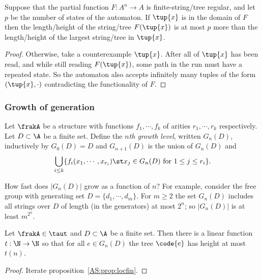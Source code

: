 
\begin{proposition} \label{AS:prop:locfin} \cite{KhNe95}
Suppose that the partial function $F:A^n \to A$ is finite-string/tree regular, and let $p$ be the number of states of the automaton.
If $\tup{x}$ is in the domain of $F$ then the length/height of the string/tree $F(\tup{x})$ is at most $p$ more than the length/height of the largest string/tree in $\tup{x}$.
\end{proposition}

\begin{proof}
Otherwise, take a counterexample  $\tup{x}$.
After all of $\tup{x}$ has been read, and while still reading $F(\tup{x})$, some path in the run must have a repeated state. 
So the automaton also accepts infinitely many tuples of the form $(\tup{x}, \cdot)$ contradicting the functionality of $F$.
\end{proof}

\subsubsection*{Growth of generation}

\begin{definition} \label{dfn:growth} \cite{KhNe95}
Let $\frakA$ be a structure with functions $f_1, \cdots, f_k$ of arities $r_1, \cdots, r_k$ respectively. 
Let $D \subset \A$ be a finite set.
Define the
{\em $n$th growth level}, written $G_n(D)$, inductively by $G_0(D) = D$
and $G_{n+1}(D)$ is the union of $G_n(D)$ and
\[
\bigcup_{i\leq k} \{f_i(x_1,\cdots,x_{r_i}) \st x_j \in G_n(D) \text{ for } 1 \leq j \leq r_i\}.
\]
\end{definition}

How fast does $|G_n(D)|$ grow as a function of $n$?  For
example, consider the free group with generating
set $D = \{d_1, \cdots, d_m\}$. For $m \geq 2$ the set $G_n(D)$ includes all strings over $D$ of length (in the generators)
at most $2^n$; so  $|G_n(D)|$ is at least $m^{2^{n}}$.

\begin{proposition} \cite{KhNe95} %
 \label{prop:growth}
Let $\frakA \in \taut$ and $D \subset \A$ be a finite set. Then there is a
linear function $t:\N \rightarrow \N$ so that for all $e \in G_n(D)$ the tree $\code{e}$ has
height at most $t(n)$.
\end{proposition}
\begin{proof}
 Iterate proposition~\ref{AS:prop:locfin}.
\end{proof}


